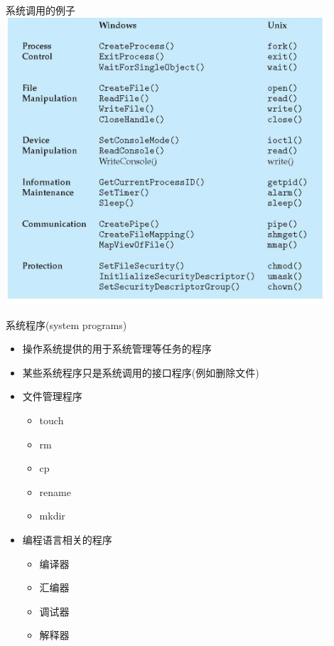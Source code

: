 \documentclass[xcolor=svgnames]{beamer}
\begin{document}
\begin{CJK*}{UTF8}{gbsn}
\begin{frame}{系统调用的例子}
\includegraphics[width=0.9\textwidth]{examples.jpg}
\end{frame}

\begin{frame}{系统程序(system programs)}
\begin{itemize}
\item 操作系统提供的用于系统管理等任务的程序
\item 某些系统程序只是系统调用的接口程序(例如删除文件)
\item 文件管理程序
\begin{itemize}
\item touch
\item rm
\item cp
\item rename
\item mkdir
\end{itemize}
\item 编程语言相关的程序
\begin{itemize}
\item 编译器
\item 汇编器
\item 调试器
\item 解释器
\end{itemize}
\end{itemize}
\end{frame}


\end{CJK*}
\end{document}
